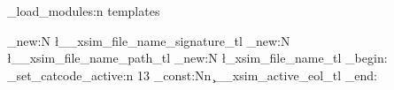 % 
% 
% 
% 
% 

\xsim_load_modules:n {templates}

\tl_new:N \l__xsim_file_name_signature_tl
\tl_new:N \l__xsim_file_name_path_tl
\tl_new:N \l_xsim_file_name_tl
\group_begin:
  \char_set_catcode_active:n {13}%
  \tl_const:Nn \c__xsim_active_eol_tl {^^M}%
\group_end:

